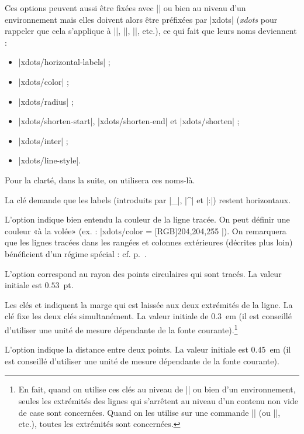 \documentclass[dvipsnames]{article}%
\begin{document}
Ces options peuvent aussi être fixées avec |\NiceMatrixOptions| ou bien au
niveau d'un environnement mais elles doivent alors être préfixées par |xdots|
(\textsl{xdots} pour rappeler que cela s'applique à |\Cdots|, |\Ldots|,
|\Vdots|, etc.), ce qui fait que leurs noms deviennent :
%
\begin{itemize}
\item |xdots/horizontal-labels| ;
\item |xdots/color| ;
\item |xdots/radius| ;
\item |xdots/shorten-start|, |xdots/shorten-end| et |xdots/shorten| ;
\item |xdots/inter| ; 
\item |xdots/line-style|.
\end{itemize}
%
Pour la clarté, dans la suite, on utilisera ces noms-là.

\bigskip
La clé  demande que les labels (introduits
par |_|, |^| et |:|) restent horizontaux.

\medskip
L'option  indique bien entendu la couleur de la ligne
tracée. On peut définir une couleur «à la volée» 
(ex. : |xdots/color = { [RGB]{204,204,255} }|). On remarquera que les
lignes tracées dans les rangées et colonnes extérieures (décrites plus loin)
bénéficient d'un régime spécial : cf. p.~\pageref{exterior}.

\medskip
L'option  correspond au rayon des points circulaires qui sont
tracés. La valeur initiale est $0.53$~pt.

\medskip
Les clés  et 
indiquent la marge qui est laissée aux deux extrémités de la ligne. La clé
 fixe les deux clés simultanément. La valeur initiale
de $0.3$~em (il est conseillé d'utiliser une unité de mesure dépendante de la
fonte courante).\footnote{En fait, quand on utilise ces clés au niveau de
  |\NiceMatrixOptions| ou bien d'un environnement, seules les extrémités des
  lignes qui s'arrêtent au niveau d'un contenu non vide de case sont concernées.
  Quand on les utilise sur une commande |\Cdots| (ou |\Vdots|, etc.), toutes les 
  extrémités sont concernées.}

\medskip
L'option  indique la distance entre deux points. La
valeur initiale est $0.45$~em (il est conseillé d'utiliser une unité de mesure
dépendante de la fonte courante).
\end{document}
